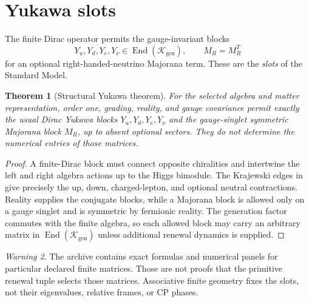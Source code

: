 \documentclass[11pt,oneside,openany]{book}
\numberwithin{equation}{chapter}
\newtheorem{theorem}{Theorem}[chapter]
\theoremstyle{definition}
\theoremstyle{remark}
\newtheorem{warning}[theorem]{Warning}
\newcommand{\End}{\operatorname{End}}
\newcommand{\Kgen}{\mathcal K_{\mathrm{gen}}}
\begin{document}
\section{Yukawa slots}
The finite Dirac operator permits the gauge-invariant blocks
\[
 Y_u,Y_d,Y_e,Y_\nu\in\End(\Kgen),
 \qquad
 M_R=M_R^T
\]
for an optional right-handed-neutrino Majorana term.  These are the \emph{slots} of the Standard Model.

\begin{theorem}[Structural Yukawa theorem]
\label{thm:yukawa-slots}
For the selected algebra and matter representation, order one, grading, reality, and gauge covariance permit exactly the usual Dirac Yukawa blocks $Y_u,Y_d,Y_e,Y_\nu$ and the gauge-singlet symmetric Majorana block $M_R$, up to absent optional sectors.  They do not determine the numerical entries of those matrices.
\end{theorem}

\begin{proof}
A finite-Dirac block must connect opposite chiralities and intertwine the left and right algebra actions up to the Higgs bimodule.  The Krajewski edges in  give precisely the up, down, charged-lepton, and optional neutral contractions.  Reality supplies the conjugate blocks, while a Majorana block is allowed only on a gauge singlet and is symmetric by fermionic reality.  The generation factor commutes with the finite algebra, so each allowed block may carry an arbitrary matrix in $\End(\Kgen)$ unless additional renewal dynamics is supplied.
\end{proof}

\begin{warning}
The archive contains exact formulas and numerical panels for particular declared finite matrices.  Those are not proofs that the primitive renewal tuple selects those matrices.  Associative finite geometry fixes the slots, not their eigenvalues, relative frames, or CP phases.
\end{warning}
\end{document}
